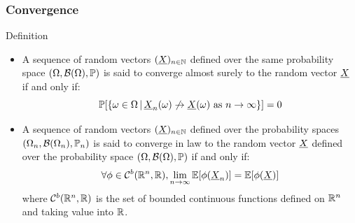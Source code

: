 \documentclass[8pt]{beamer}
\begin{document}
\begin{frame}
  \frametitle{Convergence}
  \begin{block}{Definition}
    \begin{itemize}
    \item A sequence of random vectors $(\vect{X})_{n\in\N}$ defined over the \alert{same} probability space $(\Omega, \mathcal{B}(\Omega), \P)$ is said to \alert{converge almost surely} to the random vector $\vect{X}$ if and only if:
      \begin{equation}
        \P[\{\omega\in\Omega\,|\,\vect{X}_n(\omega)\not\rightarrow\vect{X}(\omega)\mbox{ as }n\rightarrow\infty\}]=0
      \end{equation}
\item A sequence of random vectors $(\vect{X})_{n\in\N}$ defined over the probability spaces $(\Omega_n, \mathcal{B}(\Omega_n), \P_n)$ is said to \alert{converge in law} to the random vector $\vect{X}$ defined over the probability space $(\Omega, \mathcal{B}(\Omega), \P)$ if and only if:
      \begin{equation}
        \forall \phi\in\mathcal{C}^b(\R^n, \R), \lim_{n\rightarrow\infty}\E[\phi(\vect{X}_n)]=\E[\phi(\vect{X})]
      \end{equation}
      where $\mathcal{C}^b(\R^n, \R)$ is the set of bounded continuous functions defined on $\R^n$ and taking value into $\R$.
    \end{itemize}
  \end{block}
\end{frame}
\end{document}
